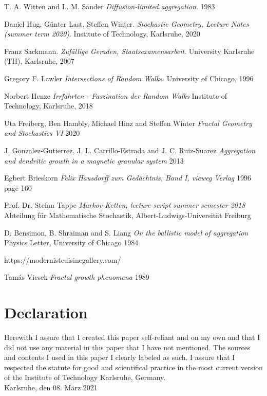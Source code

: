 \documentclass[12pt,a4paper]{scrartcl}
\numberwithin{equation}{subsection}
\newcommand{\1}{\mathbbm{1}}
\numberwithin{equation}{section}
\theoremstyle{definition}
\begin{document}
\begin{thebibliography}{biblio}
\thispagestyle{empty}

T. A. Witten and L. M. Sander
\emph{Diffusion-limited aggregation}.
1983

Daniel Hug, Günter Last, Steffen Winter.
\emph{Stochastic Geometry, 	Lecture Notes (summer term 2020)}.
Institute of Technology, Karlsruhe, 2020

Franz Sackmann. 
\emph{Zufällige Geraden, Staatsexamensarbeit}.
University Karlsruhe (TH), Karlsruhe, 2007

Gregory F. Lawler
\emph{Intersections of Random Walks}.
University of Chicago, 1996

Norbert Henze
\emph{Irrfahrten - Faszination der Random Walks}
Institute of Technology, Karlsruhe, 2018

Uta Freiberg, Ben Hambly, Michael Hinz and Steffen Winter
\emph{Fractal Geometry and Stochastics VI}
2020

J. Gonzalez-Gutierrez, J. L. Carrillo-Estrada and J. C. Ruiz-Suarez
\emph{Aggregation and dendritic growth in a magnetic granular system}
2013

Egbert Brieskorn
\emph{Felix Hausdorff zum Gedächtnis, Band I, vieweg Verlag}
1996
page 160

Prof. Dr. Stefan Tappe
\emph{Markov-Ketten, lecture script summer semester 2018}
Abteilung für Mathematische Stochastik, Albert-Ludwigs-Universität Freiburg

D. Bensimon, B. Shraiman and S. Liang
\emph{On the ballistic model of aggregation}
Physics Letter, University of Chicago
1984

https://modernistcuisinegallery.com/

Tamás Vicsek
\emph{Fractal growth phenomena}
1989


\end{thebibliography}

\newpage
  
\thispagestyle{empty}

\vspace*{8cm}


\section*{Declaration}

Herewith I assure that I created this paper self-reliant and on my own and that I did not use any material in this paper that I have not mentioned. The sources and contents I used in this paper I clearly labeled as such. I assure that I respected the statute for good and scientifical practice in the most current version of the Institute of Technology Karlsruhe, Germany.\\[2ex] 

\noindent
Karlsruhe, den 08. März 2021\\[5ex] 
\end{document}
